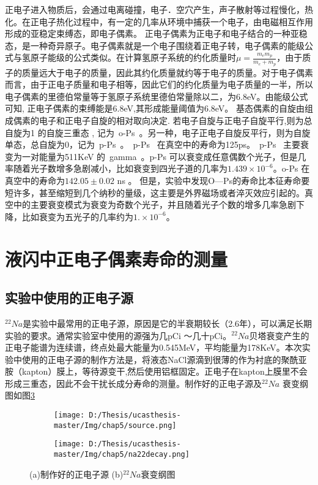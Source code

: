 正电子进入物质后，会通过电离碰撞，电子．空穴产生，声子散射等过程慢化，热化。在正电子热化过程中，有一定的几率从环境中捕获一个电子，由电磁相互作用形成的亚稳定束缚态，即电子偶素。
正电子偶素为正电子和电子结合的一种亚稳态，是一种奇异原子。电子偶素就是一个电子围绕着正电子转，电子偶素的能级公式与氢原子能级的公式类似。在计算氢原子系统的约化质量时$\mu = \frac{m_em_p}{m_e+m_p}$，由于质子的质量远大于电子的质量，因此其约化质量就约等于电子的质量。对于电子偶素而言，由于正电子质量和电子相等，因此它们的约化质量为电子质量的一半，所以电子偶素的里德伯常量等于氢原子系统里德伯常量除以二，为6.8eV。由能级公式可知, 正电子偶素的束缚能是6.8eV,其形成能量阈值为6.8eV。
基态偶素的自旋由组成偶素的电子和正电子自旋的相对取向决定. 若电子自旋与正电子自旋平行,则为总自旋为1 的自旋三重态 , 记为~o-Ps~。另一种，电子正电子自旋反平行，则为自旋单态，总自旋为0，记为~p-Ps~。~p-Ps~ 在真空中的寿命为125ps\citep{karshenboim2004precision}。~p-Ps~ 主要衰变为一对能量为511KeV 的~gamma~。p-Ps 可以衰变成任意偶数个光子，但是几率随着光子数增多急剧减小，比如衰变到四光子道的几率为$1.439\times10^{-6}$。o-Ps 在真空中的寿命为$142.05\pm0.02$ ns \citep{badertscher2007improved}。 但是，实验中发现O—Ps的寿命比本征寿命要短许多，甚至缩短到几个纳秒的量级，这主要是外界磁场或者淬灭效应引起的。真空中的主要衰变模式为衰变为奇数个光子，并且随着光子个数的增多几率急剧下降，比如衰变为五光子的几率约为$1.\times10^{-6}$。

 \section{液闪中正电子偶素寿命的测量}
 \subsection{实验中使用的正电子源}
$^{22}Na$是实验中最常用的正电子源，原因是它的半衰期较长（2.6年），可以满足长期实验的要求。通常实验室中使用的源强为几pCi ～几十pCi。$^{22}Na$贝塔衰变产生的正电子能谱为连续谱，终点处最大能量为0.545MeV，平均能量为178KeV。本次实验中使用的正电子源的制作方法是，将液态NaCl源滴到很薄的作为衬底的聚酰亚胺（kapton）膜上，等待源变干,然后使用铝框固定。正电子在kapton上膜里不会形成三重态，因此不会干扰长成分寿命的测量。制作好的正电子源及$^{22}Na$ 衰变纲图如图\ref{fig:p52}
\begin{figure}[!htbp]
  \centering
  \begin{subfigure}[b]{\MySubFactor\textwidth}
    \texttt{[image: D:/Thesis/ucasthesis-master/Img/chap5/source.png]}
    \caption{}
    \label{fig:p52_1}
  \end{subfigure}%
  \quad\quad\quad\quad\quad\quad%
  \begin{subfigure}[b]{\MySubFactor\textwidth}
    \texttt{[image: D:/Thesis/ucasthesis-master/Img/chap5/na22decay.png]}
    \caption{}
    \label{fig:p52_2}
  \end{subfigure}
  \caption{(a)制作好的正电子源 (b)$^{22}Na$衰变纲图}
  \label{fig:p52}
\end{figure}
